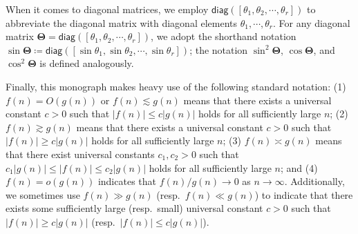 When it comes to diagonal matrices,
 we employ $\mathsf{diag}([\theta_1, \theta_2, \cdots, \theta_r])$ to abbreviate the diagonal matrix with diagonal elements $\theta_1, \cdots, \theta_r$.
For any diagonal matrix $\bm{\Theta} = \mathsf{diag}([\theta_1, \theta_2, \cdots, \theta_r])$,
we adopt the shorthand notation $\sin \bm{\Theta} \coloneqq \mathsf{diag}([\sin\theta_1, \sin\theta_2, \cdots, \sin\theta_r])$; the notation $\sin^2\bm{\Theta}$, $\cos\bm{\Theta}$, and $\cos^2\bm{\Theta}$ is defined analogously.







Finally, this monograph makes heavy use of the following standard notation:
(1) $f(n)=O\left(g(n)\right)$ or
$f(n)\lesssim g(n)$ means that there exists a universal constant $c>0$ such
that $\left|f(n)\right|\leq c|g(n)|$ holds for all sufficiently large $n$; (2) $f(n)\gtrsim g(n)$ means that there exists a universal constant $c>0$ such
that $|f(n)|\geq c\left|g(n)\right|$ holds for all sufficiently large $n$;
 (3) $f(n)\asymp g(n)$ means that there exist universal constants $c_{1},c_{2}>0$
such that $c_{1}|g(n)|\leq|f(n)|\leq c_{2}|g(n)|$ holds for all sufficiently large $n$;
and (4) $f(n)=o(g(n))$ indicates that $f(n)/g(n)\rightarrow 0$ as $n\rightarrow \infty$.
Additionally, we sometimes use $f(n)\gg g(n)$ (resp.~$f(n)\ll g(n)$) to indicate that there exists some sufficiently large (resp.~small) universal constant $c >0$ such that $|f(n)|\geq c \left|g(n)\right|$ (resp.~$|f(n)|\leq c \left|g(n)\right|$).





